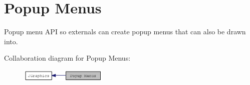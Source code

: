 \hypertarget{group__jpopupmenu}{
\section{Popup Menus}
\label{group__jpopupmenu}
}


Popup menu API so externals can create popup menus that can also be drawn into.  


Collaboration diagram for Popup Menus:\nopagebreak
\begin{figure}[H]
\begin{center}
\leavevmode
\includegraphics[width=117pt]{group__jpopupmenu}
\end{center}
\end{figure}
